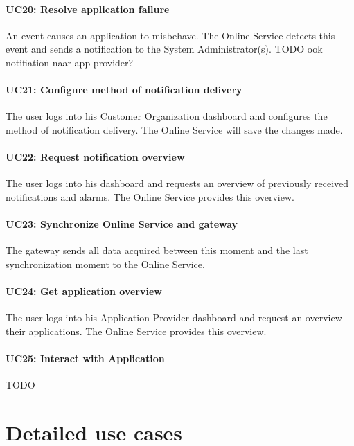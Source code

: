 \documentclass[english]{sareport}
\begin{document}
\paragraph{UC20: Resolve application failure}
An event causes an application to misbehave. The Online Service detects this event and sends a notification to the System Administrator(s). TODO ook notifiation naar app provider?

\paragraph{UC21: Configure method of notification delivery}
The user logs into his Customer Organization dashboard and configures the method of notification delivery. The Online Service will save the changes made.

\paragraph{UC22: Request notification overview}
The user logs into his dashboard and requests an overview of previously received notifications and alarms. The Online Service provides this overview.

\paragraph{UC23: Synchronize Online Service and gateway}
The gateway sends all data acquired between this moment and the last synchronization moment to the Online Service.

\paragraph{UC24: Get application overview}
The user logs into his Application Provider dashboard and request an overview their applications. The Online Service provides this overview.

\paragraph{UC25: Interact with Application}
TODO


\section{Detailed use cases}
\end{document}
